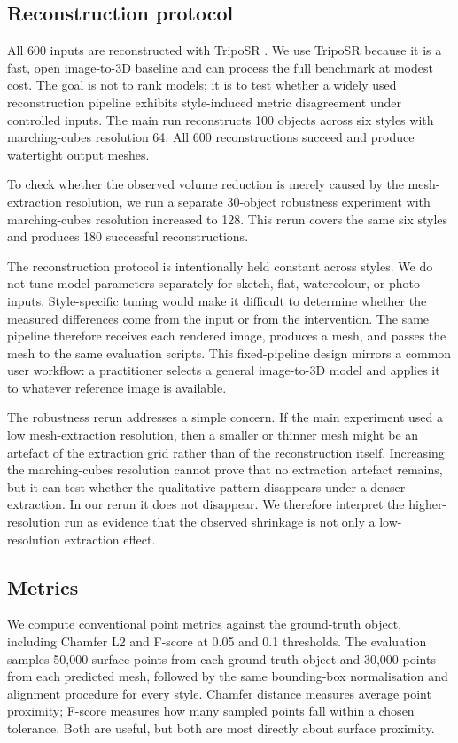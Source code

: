 \documentclass[12pt,a4paper]{article}
\begin{document}
\subsection{Reconstruction protocol}

All 600 inputs are reconstructed with TripoSR \parencite{tochilkin2024triposr}. We use TripoSR because it is a fast, open image-to-3D baseline and can process the full benchmark at modest cost. The goal is not to rank models; it is to test whether a widely used reconstruction pipeline exhibits style-induced metric disagreement under controlled inputs. The main run reconstructs 100 objects across six styles with marching-cubes resolution 64. All 600 reconstructions succeed and produce watertight output meshes.

To check whether the observed volume reduction is merely caused by the mesh-extraction resolution, we run a separate 30-object robustness experiment with marching-cubes resolution increased to 128. This rerun covers the same six styles and produces 180 successful reconstructions.

The reconstruction protocol is intentionally held constant across styles. We do not tune model parameters separately for sketch, flat, watercolour, or photo inputs. Style-specific tuning would make it difficult to determine whether the measured differences come from the input or from the intervention. The same pipeline therefore receives each rendered image, produces a mesh, and passes the mesh to the same evaluation scripts. This fixed-pipeline design mirrors a common user workflow: a practitioner selects a general image-to-3D model and applies it to whatever reference image is available.

The robustness rerun addresses a simple concern. If the main experiment used a low mesh-extraction resolution, then a smaller or thinner mesh might be an artefact of the extraction grid rather than of the reconstruction itself. Increasing the marching-cubes resolution cannot prove that no extraction artefact remains, but it can test whether the qualitative pattern disappears under a denser extraction. In our rerun it does not disappear. We therefore interpret the higher-resolution run as evidence that the observed shrinkage is not only a low-resolution extraction effect.

\subsection{Metrics}

We compute conventional point metrics against the ground-truth object, including Chamfer L2 and F-score at 0.05 and 0.1 thresholds. The evaluation samples 50,000 surface points from each ground-truth object and 30,000 points from each predicted mesh, followed by the same bounding-box normalisation and alignment procedure for every style. Chamfer distance measures average point proximity; F-score measures how many sampled points fall within a chosen tolerance. Both are useful, but both are most directly about surface proximity.
\end{document}
